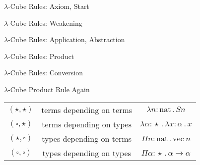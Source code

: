 \documentclass{beamer}
\newcommand{\arr}{\rightarrow}
\newcommand{\church}[4]{#1 #2\!:\!#3\,.\,#4}
\begin{document}
\begin{frame}{$\lambda$-Cube Rules: Axiom, Start}



\end{frame}


\begin{frame}{$\lambda$-Cube Rules: Weakening}



\end{frame}


\begin{frame}{$\lambda$-Cube Rules: Application, Abstraction}



\end{frame}


\begin{frame}{$\lambda$-Cube Rules: Product}



\end{frame}


\begin{frame}{$\lambda$-Cube Rules: Conversion}



\end{frame}


\begin{frame}{$\lambda$-Cube Product Rule Again}


  \begin{center}
    \begin{tabular}{ccc}
    \smallskip
    $(\star, \star)$ & terms depending on terms & $\church{\lambda}{n}{\text{nat}}{Sn}$ \\
    \smallskip
    $(\square, \star)$ & terms depending on types & $\church{\lambda}{\alpha}{\star}{\church{\lambda}{x}{\alpha}{x}}$ \\
    \smallskip
    $(\star, \square)$ & types depending on terms & $\church{\Pi}{n}{\text{nat}}{\text{vec}~n}$ \\
    \smallskip
    $(\square, \square)$ & types depending on types & $\church{\Pi}{\alpha}{\star}{\alpha \arr \alpha}$ \\
    \end{tabular}
  \end{center}

\end{frame}
\end{document}
